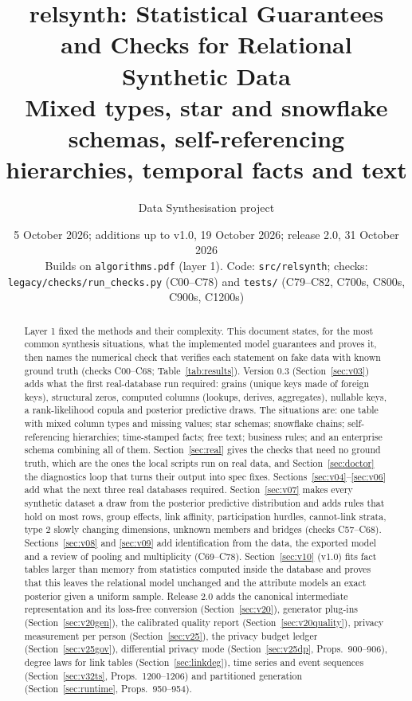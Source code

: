 \documentclass[11pt,a4paper]{article}
\title{relsynth: Statistical Guarantees and Checks for Relational Synthetic Data\\[2pt]
\large Mixed types, star and snowflake schemas, self-referencing hierarchies, temporal facts and text}
\author{Data Synthesisation project}
\date{5 October 2026; additions up to v1.0, 19 October 2026; release 2.0, 31 October 2026\\[2pt]\small Builds on \texttt{algorithms.pdf} (layer 1). Code: \texttt{src/relsynth}; checks: \texttt{legacy/checks/run\_checks.py} (C00--C78) and \texttt{tests/} (C79--C82, C700s, C800s, C900s, C1200s)}
\theoremstyle{definition}
\theoremstyle{remark}
\begin{document}
\maketitle

\begin{abstract}
Layer 1 fixed the methods and their complexity. This document states, for the most common synthesis situations, what the implemented model guarantees and proves it, then names the numerical check that verifies each statement on fake data with known ground truth (checks C00--C68; Table~\ref{tab:results}). Version 0.3 (Section~\ref{sec:v03}) adds what the first real-database run required: grains (unique keys made of foreign keys), structural zeros, computed columns (lookups, derives, aggregates), nullable keys, a rank-likelihood copula and posterior predictive draws. The situations are: one table with mixed column types and missing values; star schemas; snowflake chains; self-referencing hierarchies; time-stamped facts; free text; business rules; and an enterprise schema combining all of them. Section~\ref{sec:real} gives the checks that need no ground truth, which are the ones the local scripts run on real data, and Section~\ref{sec:doctor} the diagnostics loop that turns their output into spec fixes. Sections~\ref{sec:v04}--\ref{sec:v06} add what the next three real databases required. Section~\ref{sec:v07} makes every synthetic dataset a draw from the posterior predictive distribution and adds rules that hold on most rows, group effects, link affinity, participation hurdles, cannot-link strata, type 2 slowly changing dimensions, unknown members and bridges (checks C57--C68). Sections~\ref{sec:v08} and \ref{sec:v09} add identification from the data, the exported model and a review of pooling and multiplicity (C69--C78). Section~\ref{sec:v10} (v1.0) fits fact tables larger than memory from statistics computed inside the database and proves that this leaves the relational model unchanged and the attribute models an exact posterior given a uniform sample. Release 2.0 adds the canonical intermediate representation and its loss-free conversion (Section~\ref{sec:v20}), generator plug-ins (Section~\ref{sec:v20gen}), the calibrated quality report (Section~\ref{sec:v20quality}), privacy measurement per person (Section~\ref{sec:v25}), the privacy budget ledger (Section~\ref{sec:v25gov}), differential privacy mode (Section~\ref{sec:v25dp}, Props.~900--906), degree laws for link tables (Section~\ref{sec:linkdeg}), time series and event sequences (Section~\ref{sec:v32ts}, Props.~1200--1206) and partitioned generation (Section~\ref{sec:runtime}, Props.~950--954).
\end{abstract}
\end{document}
